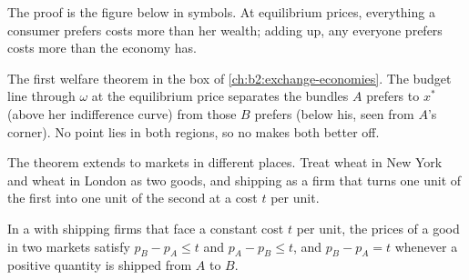 The proof is the figure below in symbols. At equilibrium prices, everything a consumer prefers costs
more than her wealth; adding up, any  everyone prefers costs more than the economy has.

\begin{omfigure}

{\small The first welfare theorem in the box of \cref{ch:b2:exchange-economies}. The budget line through
$\omega$ at the equilibrium price separates the bundles $A$ prefers to $x^*$ (above her indifference
curve) from those $B$ prefers (below his, seen from $A$'s corner). No point lies in both regions, so no
 makes both better off.}
\end{omfigure}

The theorem extends to markets in different places. Treat wheat in New York and wheat in London as two
goods, and shipping as a firm that turns one unit of the first into one unit of the second at a cost $t$
per unit.

\begin{proposition}\label{prop:b2:welfare-theorems:one-price}
In a  with shipping firms that face a constant cost $t$ per unit, the prices of a
good in two markets satisfy $p_B - p_A \le t$ and $p_A - p_B \le t$, and $p_B - p_A = t$ whenever a
positive quantity is shipped from $A$ to $B$.
\end{proposition}

